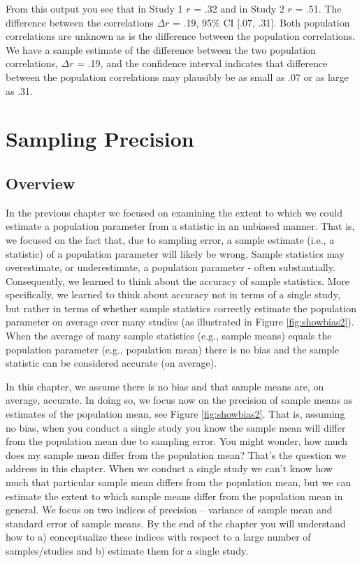 \documentclass[
]{krantz}
\begin{document}
From this output you see that in Study 1 \(r\) = .32 and in Study 2 \(r\) = .51. The difference between the correlations \(\Delta r\) = .19, 95\% CI {[}.07, .31{]}. Both population correlations are unknown as is the difference between the population correlations. We have a sample estimate of the difference between the two population correlations, \(\Delta r\) = .19, and the confidence interval indicates that difference between the population correlations may plausibly be as small as .07 or as large as .31.

\hypertarget{sampling-precision}{%
\chapter{Sampling Precision}\label{sampling-precision}}

\hypertarget{overview-3}{%
\section{Overview}\label{overview-3}}

In the previous chapter we focused on examining the extent to which we could estimate a population parameter from a statistic in an unbiased manner. That is, we focused on the fact that, due to sampling error, a sample estimate (i.e., a statistic) of a population parameter will likely be wrong. Sample statistics may overestimate, or underestimate, a population parameter - often substantially. Consequently, we learned to think about the accuracy of sample statistics. More specifically, we learned to think about accuracy not in terms of a single study, but rather in terms of whether sample statistics correctly estimate the population parameter on average over many studies (as illustrated in Figure \ref{fig:showbias2}). When the average of many sample statistics (e.g., sample means) equals the population parameter (e.g., population mean) there is no bias and the sample statistic can be considered accurate (on average).

In this chapter, we assume there is no bias and that sample means are, on average, accurate. In doing so, we focus now on the precision of sample means as estimates of the population mean, see Figure \ref{fig:showbias2}. That is, assuming no bias, when you conduct a single study you know the sample mean will differ from the population mean due to sampling error. You might wonder, how much does my sample mean differ from the population mean? That's the question we address in this chapter. When we conduct a single study we can't know how much that particular sample mean differs from the population mean, but we can estimate the extent to which sample means differ from the population mean in general. We focus on two indices of precision -- variance of sample mean and standard error of sample means. By the end of the chapter you will understand how to a) conceptualize these indices with respect to a large number of samples/studies and b) estimate them for a single study.
\end{document}
